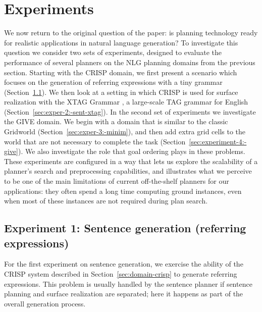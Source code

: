 \section{Experiments}
\label{sec:experiments}

We now return to the original question of the paper: is planning technology
ready for realistic applications in natural language generation? To investigate
this question we consider two sets of experiments, designed to evaluate the
performance of several planners on the NLG planning domains from the previous
section. Starting with the CRISP domain, we first present a scenario which
focuses on the generation of referring expressions with a tiny grammar
(Section~\ref{sec:exper-1:-sent}). We then look at a setting in which CRISP is
used for surface realization with the XTAG Grammar \citep{xtag01:_tr}, a
large-scale TAG grammar for English (Section~\ref{sec:exper-2:-sent-xtag}). In
the second set of experiments we investigate the GIVE domain. We begin with a
domain that is similar to the classic Gridworld
(Section~\ref{sec:exper-3:-minim}), and then add extra grid cells to the world
that are not necessary to complete the task
(Section~\ref{sec:experiment-4:-give}). We also investigate the role that goal
ordering plays in these problems. These experiments are configured in a way that
lets us explore the scalability of a planner's search and preprocessing
capabilities, and illustrates what we perceive to be one of the main limitations
of current off-the-shelf planners for our applications: they often spend a long
time computing ground instances, even when most of these instances are not
required during plan search.



\subsection{Experiment 1: Sentence generation (referring expressions)}
\label{sec:exper-1:-sent}

For the first experiment on sentence generation, we exercise the
ability of the CRISP system described in
Section~\ref{sec:domain-crisp} to generate referring expressions. This
problem is usually handled by the sentence planner if sentence
planning and surface realization are separated; here it happens as
part of the overall generation process. 

